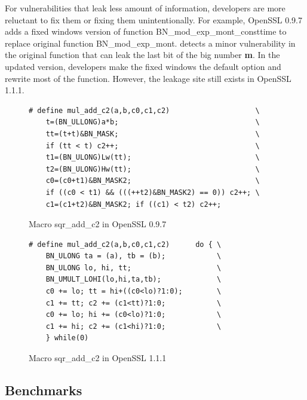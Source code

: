 For vulnerabilities that leak less amount of information,
developers are more reluctant to fix them or fixing them unintentionally. For example, OpenSSL 0.9.7 adds a fixed windows version of function \textsf{BN\_mod\_exp\_mont\_consttime} to replace original function \textsf{BN\_mod\_exp\_mont}.
\tool{} detects a minor vulnerability in the original function that can leak the last bit of the big number \textbf{m}. In the updated version, developers make the fixed windows the default option and rewrite most of the function. However, the leakage site still exists in OpenSSL 1.1.1.
\begin{figure}
    \centering
    \begin{lstlisting}[xleftmargin=.2\textwidth, xrightmargin=.0\textwidth, frame=none]
# define mul_add_c2(a,b,c0,c1,c2)                    \
    t=(BN_ULLONG)a*b;                                \
    tt=(t+t)&BN_MASK;                                \
    if (tt < t) c2++;                                \
    t1=(BN_ULONG)Lw(tt);                             \
    t2=(BN_ULONG)Hw(tt);                             \
    c0=(c0+t1)&BN_MASK2;                             \
    if ((c0 < t1) && (((++t2)&BN_MASK2) == 0)) c2++; \
    c1=(c1+t2)&BN_MASK2; if ((c1) < t2) c2++;
\end{lstlisting}
    \vspace*{-6pt}
    \caption{Macro \textsf{sqr\_add\_c2} in OpenSSL 0.9.7}
    \label{fig:old_sqr2}
    \vspace*{-8pt}
\end{figure}


\begin{figure}
    \centering
    \begin{lstlisting}[xleftmargin=.2\textwidth, xrightmargin=.0\textwidth, frame=none]
# define mul_add_c2(a,b,c0,c1,c2)      do { \
    BN_ULONG ta = (a), tb = (b);            \
    BN_ULONG lo, hi, tt;                    \
    BN_UMULT_LOHI(lo,hi,ta,tb);             \
    c0 += lo; tt = hi+((c0<lo)?1:0);        \
    c1 += tt; c2 += (c1<tt)?1:0;            \
    c0 += lo; hi += (c0<lo)?1:0;            \
    c1 += hi; c2 += (c1<hi)?1:0;            \
    } while(0)
\end{lstlisting}
\caption{Macro \textsf{sqr\_add\_c2} in OpenSSL 1.1.1}
\label{fig:new_sqr2}
\end{figure}



\subsection{Benchmarks}\label{sec:eval_countermeasures}
